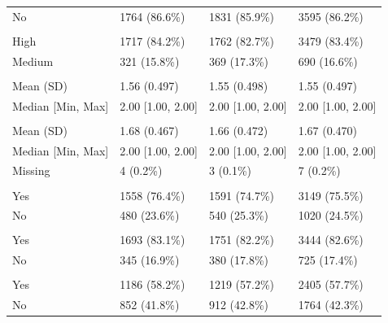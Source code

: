 \documentclass[
]{article}
\begin{document}
\begin{longtable}[t]{llll}
\hspace{1em}No & 1764 (86.6\%) & 1831 (85.9\%) & 3595 (86.2\%)\\
\addlinespace[0.3em]
\multicolumn{4}{l}{\textbf{CVRISK}}\\
\hspace{1em}High & 1717 (84.2\%) & 1762 (82.7\%) & 3479 (83.4\%)\\
\hspace{1em}Medium & 321 (15.8\%) & 369 (17.3\%) & 690 (16.6\%)\\
\addlinespace[0.3em]
\multicolumn{4}{l}{\textbf{HBA1CGRN}}\\
\hspace{1em}Mean (SD) & 1.56 (0.497) & 1.55 (0.498) & 1.55 (0.497)\\
\hspace{1em}Median [Min, Max] & 2.00 [1.00, 2.00] & 2.00 [1.00, 2.00] & 2.00 [1.00, \vphantom{1} 2.00]\\
\addlinespace[0.3em]
\multicolumn{4}{l}{\textbf{DDURGRN}}\\
\hspace{1em}Mean (SD) & 1.68 (0.467) & 1.66 (0.472) & 1.67 (0.470)\\
\hspace{1em}Median [Min, Max] & 2.00 [1.00, 2.00] & 2.00 [1.00, 2.00] & 2.00 [1.00, 2.00]\\
\hspace{1em}Missing & 4 (0.2\%) & 3 (0.1\%) & 7 (0.2\%)\\
\addlinespace[0.3em]
\multicolumn{4}{l}{\textbf{statin\_use}}\\
\hspace{1em}Yes & 1558 (76.4\%) & 1591 (74.7\%) & 3149 (75.5\%)\\
\hspace{1em}No & 480 (23.6\%) & 540 (25.3\%) & 1020 (24.5\%)\\
\addlinespace[0.3em]
\multicolumn{4}{l}{\textbf{antihypertensives}}\\
\hspace{1em}Yes & 1693 (83.1\%) & 1751 (82.2\%) & 3444 (82.6\%)\\
\hspace{1em}No & 345 (16.9\%) & 380 (17.8\%) & 725 (17.4\%)\\
\addlinespace[0.3em]
\multicolumn{4}{l}{\textbf{betab}}\\
\hspace{1em}Yes & 1186 (58.2\%) & 1219 (57.2\%) & 2405 (57.7\%)\\
\hspace{1em}No & 852 (41.8\%) & 912 (42.8\%) & 1764 (42.3\%)\\

\end{longtable}
\end{document}
